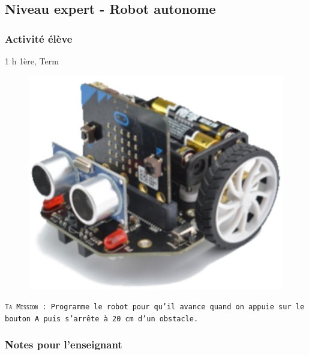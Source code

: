 \newpage


\subsection{Niveau expert - Robot autonome}

\subsubsection{Activité élève}

\cartouche
{1 h}           %
{1ère, Term}    %
{}              %
{}              %
{}              %



\begin{figure}
    \includegraphics[width=\linewidth]{res/mini-maqueen.png}
\end{figure}


\begin{eleve}

    \texttt{\textsc{Ta Mission} : Programme le robot \mq pour qu'il avance quand on appuie sur le bouton A puis s'arrête à 20 cm d'un obstacle.
    }
\end{eleve}



\subsubsection{Notes pour l'enseignant}

